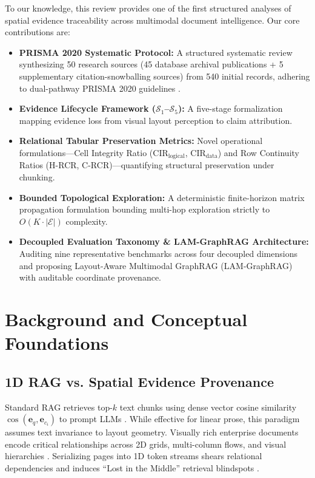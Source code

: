 \documentclass[conference,a4paper]{IEEEtran}
\begin{document}
To our knowledge, this review provides one of the first structured analyses of spatial evidence traceability across multimodal document intelligence. Our core contributions are:
\begin{itemize}
    \item \textbf{PRISMA 2020 Systematic Protocol:} A structured systematic review synthesizing 50 research sources (45 database archival publications + 5 supplementary citation-snowballing sources) from 540 initial records, adhering to dual-pathway PRISMA 2020 guidelines \cite{page2021prisma}.
    \item \textbf{Evidence Lifecycle Framework ($\mathcal{S}_1$--$\mathcal{S}_5$):} A five-stage formalization mapping evidence loss from visual layout perception to claim attribution.
    \item \textbf{Relational Tabular Preservation Metrics:} Novel operational formulations---Cell Integrity Ratio ($\text{CIR}_{\text{logical}}$, $\text{CIR}_{\text{data}}$) and Row Continuity Ratios (H-RCR, C-RCR)---quantifying structural preservation under chunking.
    \item \textbf{Bounded Topological Exploration:} A deterministic finite-horizon matrix propagation formulation bounding multi-hop exploration strictly to $O(K \cdot |\mathcal{E}|)$ complexity.
    \item \textbf{Decoupled Evaluation Taxonomy \& LAM-GraphRAG Architecture:} Auditing nine representative benchmarks across four decoupled dimensions and proposing Layout-Aware Multimodal GraphRAG (LAM-GraphRAG) with auditable coordinate provenance.
\end{itemize}

\section{Background and Conceptual Foundations}

\subsection{1D RAG vs. Spatial Evidence Provenance}
Standard RAG retrieves top-$k$ text chunks using dense vector cosine similarity $\cos(\mathbf{e}_q, \mathbf{e}_{c_i})$ to prompt LLMs \cite{brown2020, devlin2019, lewis2020, guu2020}. While effective for linear prose, this paradigm assumes text invariance to layout geometry. Visually rich enterprise documents encode critical relationships across 2D grids, multi-column flows, and visual hierarchies \cite{radford2021, liu2023llava}. Serializing pages into 1D token streams shears relational dependencies and induces ``Lost in the Middle'' retrieval blindspots \cite{liu2024lost}.
\end{document}
